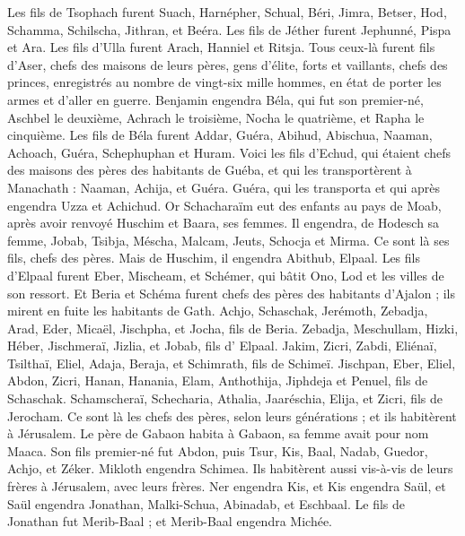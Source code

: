 \begin{multicols}{2}
Les fils de Tsophach furent Suach, Harnépher, Schual, Béri, Jimra,
Betser, Hod, Schamma, Schilscha, Jithran, et Beéra.
Les fils de Jéther furent Jephunné, Pispa et Ara.
Les fils d'Ulla furent Arach, Hanniel et Ritsja.
Tous ceux-là furent fils d'Aser, chefs des maisons de leurs pères, gens d'élite, forts et vaillants, chefs des princes, enregistrés au nombre de vingt-six mille hommes, en état de porter les armes et d’aller en guerre.
\VerseOne{}Benjamin engendra Béla, qui fut son premier-né, Aschbel le deuxième, Achrach le troisième,
Nocha le quatrième, et Rapha le cinquième.
Les fils de Béla furent Addar, Guéra, Abihud,
Abischua, Naaman, Achoach,
Guéra, Schephuphan et Huram.
Voici les fils d'Echud, qui étaient chefs des maisons des pères des habitants de Guéba, et qui les transportèrent à Manachath :
Naaman, Achija, et Guéra. Guéra, qui les transporta et qui après engendra Uzza et Achichud.
Or Schacharaïm eut des enfants au pays de Moab, après avoir renvoyé Huschim et Baara, ses femmes.
Il engendra, de Hodesch sa femme, Jobab, Tsibja, Méscha, Malcam,
Jeuts, Schocja et Mirma. Ce sont là ses fils, chefs des pères.
Mais de Huschim, il engendra Abithub, Elpaal.
Les fils d'Elpaal furent Eber, Mischeam, et Schémer, qui bâtit Ono, Lod et les villes de son ressort.
Et Beria et Schéma furent chefs des pères des habitants d'Ajalon ; ils mirent en fuite les habitants de Gath.
Achjo, Schaschak, Jerémoth,
Zebadja, Arad, Eder,
Micaël, Jischpha, et Jocha, fils de Beria.
Zebadja, Meschullam, Hizki, Héber,
Jischmeraï, Jizlia, et Jobab, fils d' Elpaal.
Jakim, Zicri, Zabdi,
Eliénaï, Tsilthaï, Eliel,
Adaja, Beraja, et Schimrath, fils de Schimeï.
Jischpan, Eber, Eliel,
Abdon, Zicri, Hanan,
Hanania, Elam, Anthothija,
Jiphdeja et Penuel, fils de Schaschak.
Schamscheraï, Schecharia, Athalia,
Jaaréschia, Elija, et Zicri, fils de Jerocham.
Ce sont là les chefs des pères, selon leurs générations ; et ils habitèrent à Jérusalem.
Le père de Gabaon habita à Gabaon, sa femme avait pour nom Maaca.
Son fils premier-né fut Abdon, puis Tsur, Kis, Baal, Nadab,
Guedor, Achjo, et Zéker.
Mikloth engendra Schimea. Ils habitèrent aussi vis-à-vis de leurs frères à Jérusalem, avec leurs frères.
Ner engendra Kis, et Kis engendra Saül, et Saül engendra Jonathan, Malki-Schua, Abinadab, et Eschbaal.
Le fils de Jonathan fut  Merib-Baal ; et Merib-Baal engendra Michée.

\end{multicols}
